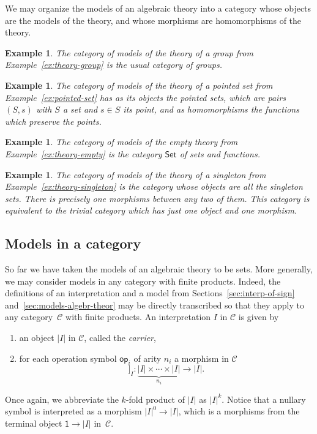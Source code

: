 \documentclass{amsart}
\newcommand{\CC}{\mathcal{C}}
\newcommand{\Set}{\mathsf{Set}}
\newcommand{\op}{\mathsf{op}}
\newcommand{\one}{\mathsf{1}}
\newcommand{\sem}[1]{[\![#1]\!]}
\newtheorem{example}[definition]{Example}
\begin{document}
We may organize the models of an algebraic theory into a category whose objects are the
models of the theory, and whose morphisms are homomorphisms of the theory.

\begin{example}
  The category of models of the theory of a group from Example~\ref{ex:theory-group} is
  the usual category of groups.
\end{example}

\begin{example}
  The category of models of the theory of a pointed set from Example~\ref{ex:pointed-set}
  has as its objects the pointed sets, which are pairs $(S, s)$ with $S$ a set and
  $s \in S$ its \emph{point}, and as homomorphisms the functions which preserve the
  points.
\end{example}

\begin{example}
  The category of models of the empty theory from Example~\ref{ex:theory-empty} is the
  category $\Set$ of sets and functions.
\end{example}

\begin{example}
  The category of models of the theory of a singleton from
  Example~\ref{ex:theory-singleton} is the category whose objects are all the singleton
  sets. There is precisely one morphisms between any two of them. This category is
  equivalent to the trivial category which has just one object and one morphism.
\end{example}

\subsection{Models in a category}
\label{sec:models-category}

So far we have taken the models of an algebraic theory to be sets. More generally, we may
consider models in any category with finite products. Indeed, the definitions of an
interpretation and a model from Sections~\ref{sec:interp-of-sign}
and~\ref{sec:models-algebr-theor} may be directly transcribed so that they apply to any
category~$\CC$ with finite products. An interpretation $I$ in $\CC$ is given by
%
\begin{enumerate}
\item an object $|I|$ in $\CC$, called the \emph{carrier},
\item for each operation symbol $\op_i$ of arity $n_i$ a morphism in $\CC$
  \begin{equation*}
    \sem{\op_i}_I : \underbrace{|I| \times \cdots \times |I|}_{n_i} \to |I|.
  \end{equation*}
\end{enumerate}
%
Once again, we abbreviate the $k$-fold product of $|I|$ as $|I|^k$. Notice that a nullary
symbol is interpreted as a morphism $|I|^0 \to |I|$, which is a morphisms from the
terminal object $\one \to |I|$ in~$\CC$.
\end{document}
